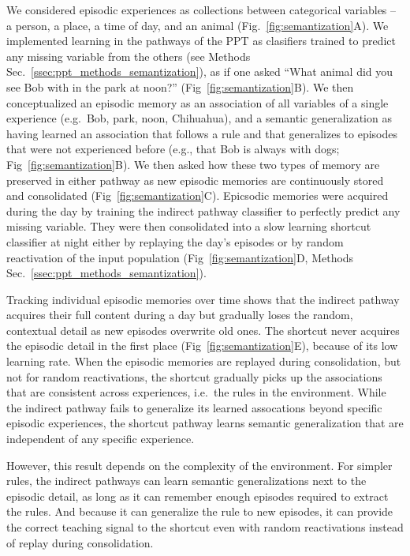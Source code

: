 We considered episodic experiences as collections between categorical variables -- a person, a place, a time of day, and an animal (Fig.~\ref{fig:semantization}A). We implemented learning in the pathways of the PPT as clasifiers trained to predict any missing variable from the others (see Methods Sec.~\ref{ssec:ppt_methods_semantization}), as if one asked ``What animal did you see Bob with in the park at noon?'' (Fig~\ref{fig:semantization}B). We then conceptualized an episodic memory as an association of all variables of a single experience (e.g.~Bob, park, noon, Chihuahua), and a semantic generalization as having learned an association that follows a rule and that generalizes to episodes that were not experienced before (e.g., that Bob is always with dogs; Fig~\ref{fig:semantization}B). We then asked how these two types of memory are preserved in either pathway as new episodic memories are continuously stored and consolidated (Fig~\ref{fig:semantization}C). Epicsodic memories were acquired during the day by training the indirect pathway classifier to perfectly predict any missing variable. They were then consolidated into a slow learning shortcut classifier at night either by replaying the day's episodes or by random reactivation of the input population (Fig~\ref{fig:semantization}D, Methods Sec.~\ref{ssec:ppt_methods_semantization}).

Tracking individual episodic memories over time shows that the indirect pathway acquires their full content during a day but gradually loses the random, contextual detail as new episodes overwrite old ones. The shortcut never acquires the episodic detail in the first place (Fig~\ref{fig:semantization}E), because of its low learning rate. When the episodic memories are replayed during consolidation, but not for random reactivations, the shortcut gradually picks up the associations that are consistent across experiences, i.e.~the rules in the environment. While the indirect pathway fails to generalize its learned assocations beyond specific episodic experiences, the shortcut pathway learns semantic generalization that are independent of any specific experience.

However, this result depends on the complexity of the environment. For simpler rules, the indirect pathways can learn semantic generalizations next to the episodic detail, as long as it can remember enough episodes required to extract the rules. And because it can generalize the rule to new episodes, it can provide the correct teaching signal to the shortcut even with random reactivations instead of replay during consolidation.

